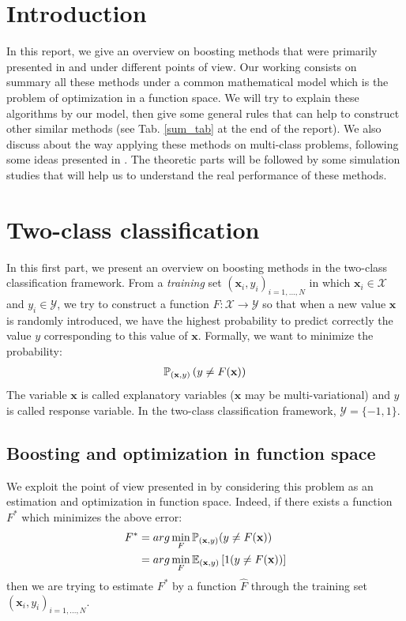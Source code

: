 \documentclass[a4paper,twoside,12pt]{article}
\title{\MYTITLE}
\author{\textsc{Vu} Tuan Hung and \textsc{Do} Quoc Khanh}
\date{\today}
\begin{document}
\maketitle
\pagestyle{fancy}

\section{Introduction}
In this report, we give an overview on boosting methods that were primarily presented in \cite{boost} and \cite{trebst} under different points of view. Our working consists on summary all these methods under a common mathematical model which is the problem of optimization in a function space. We will try to explain these algorithms by our model, then give some general rules that can help to construct other similar methods (see Tab. \ref{sum_tab} at the end of the report). We also discuss about the way applying these methods on multi-class problems, following some ideas presented in \cite{SchaAndSin1998}. The theoretic parts will be followed by some simulation studies that will help us to understand the real performance of these methods.

\section{Two-class classification}
In this first part, we present an overview on boosting methods in the two-class classification framework. From a \textsl{training} set $(\textbf{x}_i, y_i)_{i = 1,...,N}$ in which $\textbf{x}_i \in \mathcal{X}$ and $y_i \in \mathcal{Y}$, we try to construct a function $F: \mathcal{X} \rightarrow \mathcal{Y}$ so that when a new value $\textbf{x}$ is randomly introduced, we have the highest probability to predict correctly the value $y$ corresponding to this value of $\textbf{x}$. Formally, we want to minimize the probability:
\begin{align}
    \mathbb{P}_{(\textbf{x}, y)} \left( y \neq F(\textbf{x})\right) \notag
\end{align}
The variable $\textbf{x}$ is called explanatory variables ($\textbf{x}$ may be multi-variational) and $y$ is called response variable. In the two-class classification framework, $\mathcal{Y} = \{ -1, 1\}$.

\subsection{Boosting and optimization in function space}\label{boo_fun_sp}
We exploit the point of view presented in \cite{trebst} by considering this problem as an estimation and optimization in function space. Indeed, if there exists a function $F^{*}$ which minimizes the above error:
\begin{align}
    F^{*} &= arg\min\limits_{F} \mathbb{P}_{(\textbf{x},y)} (y \neq F(\textbf{x})) \notag \\
    &= arg\min\limits_{F} \mathbb{E}_{(\textbf{x}, y)} \left[ 1(y \neq F(\textbf{x}))\right] \notag
\end{align}
then we are trying to estimate $F^{*}$ by a function $\hat{F}$ through the training set $(\textbf{x}_i, y_i)_{i=1,...,N}$.
\end{document}
